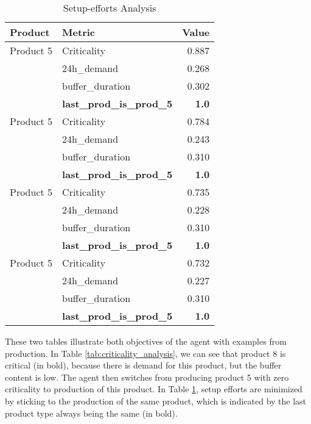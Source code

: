 \begin{table}[ht!]
    \footnotesize
    \centering
    \caption{Setup-efforts Analysis}
    \label{tab:setup_efforts_analysis}
    \begin{tabularx}{\textwidth}{lXr}
        \toprule
        \textbf{Product} & \textbf{Metric}                  & \textbf{Value} \\
        \midrule
        Product 5        & Criticality                      & 0.887          \\
                         & 24h\_demand                      & 0.268          \\
                         & buffer\_duration                 & 0.302          \\
                         & \textbf{last\_prod\_is\_prod\_5} & \textbf{1.0}   \\
        \midrule
        Product 5        & Criticality                      & 0.784          \\
                         & 24h\_demand                      & 0.243          \\
                         & buffer\_duration                 & 0.310          \\
                         & \textbf{last\_prod\_is\_prod\_5} & \textbf{1.0}   \\
        \midrule
        Product 5        & Criticality                      & 0.735          \\
                         & 24h\_demand                      & 0.228          \\
                         & buffer\_duration                 & 0.310          \\
                         & \textbf{last\_prod\_is\_prod\_5} & \textbf{1.0}   \\
        \midrule
        Product 5        & Criticality                      & 0.732          \\
                         & 24h\_demand                      & 0.227          \\
                         & buffer\_duration                 & 0.310          \\
                         & \textbf{last\_prod\_is\_prod\_5} & \textbf{1.0}   \\
        \bottomrule
    \end{tabularx}
\end{table}
\FloatBarrier

These two tables illustrate both objectives of the agent with examples from production.
In Table \ref{tab:criticality_analysis}, we can see that product 8 is critical (in bold), because there is demand for this product, but the buffer content is low. The agent then switches from producing product 5 with zero criticality to production of this product.
In Table \ref{tab:setup_efforts_analysis}, setup efforts are minimized by sticking to the production of the same product, which is indicated by the last product type always being the same (in bold).

